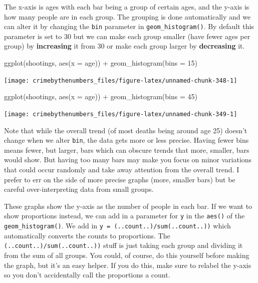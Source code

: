 \documentclass[
]{krantz}
\makeatletter
\newenvironment{Shaded}{\begin{snugshade}}{\end{snugshade}}
\newcommand{\AttributeTok}[1]{\textcolor[rgb]{0.61,0.61,0.61}{#1}}
\newcommand{\DecValTok}[1]{\textcolor[rgb]{0.06,0.06,0.06}{#1}}
\newcommand{\FunctionTok}[1]{\textcolor[rgb]{0,0,0}{#1}}
\newcommand{\NormalTok}[1]{#1}
\newcommand{\SpecialCharTok}[1]{\textcolor[rgb]{0,0,0}{#1}}
\newenvironment{kframe}{%
\medskip{}
\setlength{\fboxsep}{.8em}
 \def\at@end@of@kframe{}%
 \ifinner\ifhmode%
  \def\at@end@of@kframe{\end{minipage}}%
  \begin{minipage}{\columnwidth}%
 \fi\fi%
 \def\FrameCommand##1{\hskip\@totalleftmargin \hskip-\fboxsep
 \colorbox{shadecolor}{##1}\hskip-\fboxsep
     \hskip-\linewidth \hskip-\@totalleftmargin \hskip\columnwidth}%
 \MakeFramed {\advance\hsize-\width
   \@totalleftmargin\z@ \linewidth\hsize
   \@setminipage}}%
 {\par\unskip\endMakeFramed%
 \at@end@of@kframe}
\renewenvironment{Shaded}{\begin{kframe}}{\end{kframe}}
\makeatother
\begin{document}
The x-axis is ages with each bar being a group of certain
ages, and the y-axis is how many people are in each group.
The grouping is done automatically and we can alter it by
changing the \texttt{bin} parameter in
\texttt{geom\_histogram()}. By default this parameter is set
to 30 but we can make each group smaller (have fewer ages
per group) by \textbf{increasing} it from 30 or make each
group larger by \textbf{decreasing} it.

\begin{Shaded}
\begin{Highlighting}[]
\FunctionTok{ggplot}\NormalTok{(shootings, }\FunctionTok{aes}\NormalTok{(}\AttributeTok{x =}\NormalTok{ age)) }\SpecialCharTok{+}
  \FunctionTok{geom\_histogram}\NormalTok{(}\AttributeTok{bins =} \DecValTok{15}\NormalTok{)}
\end{Highlighting}
\end{Shaded}

\begin{center}\texttt{[image: crimebythenumbers\_files/figure-latex/unnamed-chunk-348-1]} \end{center}

\begin{Shaded}
\begin{Highlighting}[]
\FunctionTok{ggplot}\NormalTok{(shootings, }\FunctionTok{aes}\NormalTok{(}\AttributeTok{x =}\NormalTok{ age)) }\SpecialCharTok{+}
  \FunctionTok{geom\_histogram}\NormalTok{(}\AttributeTok{bins =} \DecValTok{45}\NormalTok{)}
\end{Highlighting}
\end{Shaded}

\begin{center}\texttt{[image: crimebythenumbers\_files/figure-latex/unnamed-chunk-349-1]} \end{center}

Note that while the overall trend (of most deaths being
around age 25) doesn't change when we alter \texttt{bin},
the data gets more or less precise. Having fewer bins means
fewer, but larger, bars which can obscure trends that more,
smaller, bars would show. But having too many bars may make
you focus on minor variations that could occur randomly and
take away attention from the overall trend. I prefer to err
on the side of more precise graphs (more, smaller bars) but
be careful over-interpreting data from small groups.

These graphs show the y-axis as the number of people in each
bar. If we want to show proportions instead, we can add in a
parameter for \texttt{y} in the \texttt{aes()} of the
\texttt{geom\_histogram()}. We add in
\texttt{y\ =\ (..count..)/sum(..count..))} which
automatically converts the counts to proportions. The
\texttt{(..count..)/sum(..count..))} stuff is just taking
each group and dividing it from the sum of all groups. You
could, of course, do this yourself before making the graph,
but it's an easy helper. If you do this, make sure to
relabel the y-axis so you don't accidentally call the
proportions a count.
\end{document}
